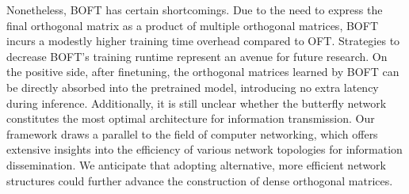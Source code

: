 Nonetheless, BOFT has certain shortcomings. Due to the need to express the final orthogonal matrix as a product of multiple orthogonal matrices, BOFT incurs a modestly higher training time overhead compared to OFT. Strategies to decrease BOFT’s training runtime represent an avenue for future research. On the positive side, after finetuning, the orthogonal matrices learned by BOFT can be directly absorbed into the pretrained model, introducing no extra latency during inference. Additionally, it is still unclear whether the butterfly network constitutes the most optimal architecture for information transmission. Our framework draws a parallel to the field of computer networking, which offers extensive insights into the efficiency of various network topologies for information dissemination. We anticipate that adopting alternative, more efficient network structures could further advance the construction of dense orthogonal matrices.